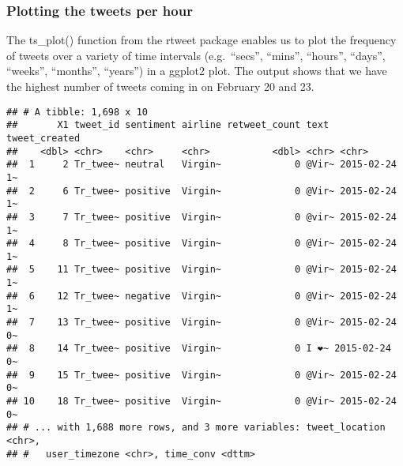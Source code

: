 \documentclass[
]{article}
\newenvironment{Shaded}{\begin{snugshade}}{\end{snugshade}}
\newcommand{\CommentTok}[1]{\textcolor[rgb]{0.56,0.35,0.01}{\textit{#1}}}
\newcommand{\DataTypeTok}[1]{\textcolor[rgb]{0.13,0.29,0.53}{#1}}
\newcommand{\KeywordTok}[1]{\textcolor[rgb]{0.13,0.29,0.53}{\textbf{#1}}}
\newcommand{\NormalTok}[1]{#1}
\newcommand{\OperatorTok}[1]{\textcolor[rgb]{0.81,0.36,0.00}{\textbf{#1}}}
\newcommand{\StringTok}[1]{\textcolor[rgb]{0.31,0.60,0.02}{#1}}
\begin{document}
\hypertarget{plotting-the-tweets-per-hour}{%
\subsubsection{Plotting the tweets per
hour}\label{plotting-the-tweets-per-hour}}

The ts\_plot() function from the rtweet package enables us to plot the
frequency of tweets over a variety of time intervals (e.g.~``secs'',
``mins'', ``hours'', ``days'', ``weeks'', ``months'', ``years'') in a
ggplot2 plot. The output shows that we have the highest number of tweets
coming in on February 20 and 23.

\begin{Shaded}
\end{Shaded}

\begin{verbatim}
## # A tibble: 1,698 x 10
##       X1 tweet_id sentiment airline retweet_count text  tweet_created
##    <dbl> <chr>    <chr>     <chr>           <dbl> <chr> <chr>        
##  1     2 Tr_twee~ neutral   Virgin~             0 @Vir~ 2015-02-24 1~
##  2     6 Tr_twee~ positive  Virgin~             0 @Vir~ 2015-02-24 1~
##  3     7 Tr_twee~ positive  Virgin~             0 @vir~ 2015-02-24 1~
##  4     8 Tr_twee~ positive  Virgin~             0 @Vir~ 2015-02-24 1~
##  5    11 Tr_twee~ positive  Virgin~             0 @Vir~ 2015-02-24 1~
##  6    12 Tr_twee~ negative  Virgin~             0 @Vir~ 2015-02-24 1~
##  7    13 Tr_twee~ positive  Virgin~             0 @Vir~ 2015-02-24 0~
##  8    14 Tr_twee~ positive  Virgin~             0 I ❤️~ 2015-02-24 0~
##  9    15 Tr_twee~ positive  Virgin~             0 @Vir~ 2015-02-24 0~
## 10    18 Tr_twee~ positive  Virgin~             0 @Vir~ 2015-02-24 0~
## # ... with 1,688 more rows, and 3 more variables: tweet_location <chr>,
## #   user_timezone <chr>, time_conv <dttm>
\end{verbatim}
\end{document}
